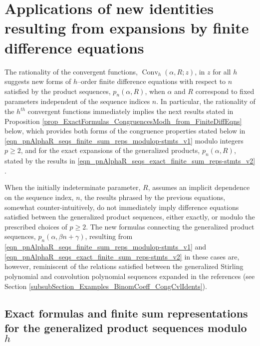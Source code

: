 \documentclass[12pt,reqno]{article}
\numberwithin{sfootnote}{section}
\numberwithin{equation}{section}
\theoremstyle{plain}
\theoremstyle{definition}
\theoremstyle{remark}
\newcommand{\cf}[0]{cf.\ }
\newcommand{\pn}[3]{\ensuremath{p_{#1}\left(#2, #3\right)}}
\newcommand{\ConvGF}[4]{\ensuremath{\Conv_{#1}\left(#2, #3; #4\right)}}
\DeclareMathOperator{\Conv}{Conv}
\begin{document}
\section{Applications of new identities resulting from expansions by 
         finite difference equations} 
\label{subSection_FiniteDiffEqns_for_the_GenFactFns} 

The rationality of the convergent functions, $\ConvGF{h}{\alpha}{R}{z}$, in 
$z$ for all $h$ suggests new forms of $h$--order finite difference equations 
with respect to $n$ satisfied by the product sequences, $p_n(\alpha, R)$, 
when $\alpha$ and $R$ correspond to fixed parameters independent of the 
sequence indices $n$. 
In particular, the 
rationality of the $h^{th}$ convergent functions immediately 
implies the next results stated in 
Proposition \ref{prop_ExactFormulas_CongruencesModh_from_FiniteDiffEqns} 
below, which provides both forms of the congruence properties stated below in 
\eqref{eqn_pnAlphaR_seqs_finite_sum_reps_modulop-stmts_v1} modulo 
integers $p \geq 2$, and for the exact expansions of the 
generalized products, $p_n(\alpha, R)$, stated by the results in 
\eqref{eqn_pnAlphaR_seqs_exact_finite_sum_reps-stmts_v2} 
\citep[\S 2.3]{GFLECT} \citep[\S 7.2]{GKP}. 

When the initially indeterminate parameter, $R$, 
assumes an implicit dependence on the sequence index, $n$, the 
results phrased by the previous equations, 
somewhat counter-intuitively, do not immediately imply difference equations 
satisfied between the generalized product sequences, 
either exactly, or modulo the prescribed choices of $p \geq 2$. 
The new formulas connecting the generalized product sequences, 
$\pn{n}{\alpha}{\beta n + \gamma}$, resulting from 
\eqref{eqn_pnAlphaR_seqs_finite_sum_reps_modulop-stmts_v1} and 
\eqref{eqn_pnAlphaR_seqs_exact_finite_sum_reps-stmts_v2} 
in these cases are, however, reminiscent of the relations satisfied 
between the generalized Stirling polynomial and 
convolution polynomial sequences expanded in the references 
\citep{CVLPOLYS,MULTIFACTJIS} \citep[\cf \S 6.2]{GKP} 
(see Section \ref{subsubSection_Examples_BinomCoeff_CongCvlIdents}). 

\subsection{Exact formulas and finite sum representations for the 
            generalized product sequences modulo $h$} 
\label{subSection_FiniteDiffEqns_for_the_GenFactFns-ExactFormulas_Stmts} 
\end{document}

